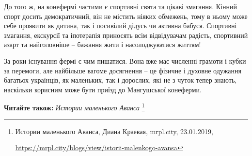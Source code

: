 
До того ж, на конефермі частими є спортивні свята та цікаві змагання. Кінний
спорт досить демократичний, він не містить ніяких обмежень, тому в ньому може
себе проявити як дитина, так і посивілий дідусь чи активна бабуся. Спортивні
змагання, екскурсії та іпотерапія приносять всім відвідувачам радість,
спортивний азарт та найголовніше – бажання жити і насолоджуватися життям!

За роки існування фермі є чим пишатися. Вона вже має численні грамоти і кубки
за перемоги, але найбільше вагоме досягнення – це фізичне і духовне одужання
багатьох українців, як маленьких, так і дорослих, які не з чуток тепер знають,
наскільки корисним може бути приїзд до Мангушської конеферми.

\textbf{Читайте також:} \emph{Истории маленького Аванса}%
\footnote{Истории маленького Аванса, Диана Краевая, mrpl.city, 23.01.2019, \par%
\url{https://mrpl.city/blogs/view/istorii-malenkogo-avansa}
}
